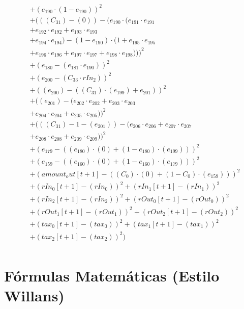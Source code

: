 \documentclass[10pt, a4paper]{article}
\begin{document}
\begin{small}
\begin{align*}
& + (e_{190} \cdot (1 - e_{190}))^{2} \\
& + (((C_{31}) - (0)) - (e_{190} \cdot (e_{191} \cdot e_{191} \\
& + e_{192} \cdot e_{192} + e_{193} \cdot e_{193} \\
& + e_{194} \cdot e_{194}) - (1 - e_{190}) \cdot (1 + e_{195} \cdot e_{195} \\
& + e_{196} \cdot e_{196} + e_{197} \cdot e_{197} + e_{198} \cdot e_{198})))^{2} \\
& + (e_{180} - (e_{181} \cdot e_{190}))^{2} \\
& + (e_{200} - (C_{33}  \cdot  rIn_2))^{2} \\
& + ((e_{200}) - ((C_{31})  \cdot  (e_{199}) + e_{201}))^{2} \\
& + ((e_{201}) - (e_{202} \cdot e_{202} + e_{203} \cdot e_{203} \\
& + e_{204} \cdot e_{204} + e_{205} \cdot e_{205}))^{2} \\
& + (((C_{31}) - 1 - (e_{201})) - (e_{206} \cdot e_{206} + e_{207} \cdot e_{207} \\
& + e_{208} \cdot e_{208} + e_{209} \cdot e_{209}))^{2} \\
& + (e_{179} - ((e_{180})  \cdot  (0) + (1 - e_{180})  \cdot  (e_{199})))^{2} \\
& + (e_{159} - ((e_{160})  \cdot  (0) + (1 - e_{160})  \cdot  (e_{179})))^{2} \\
& + (amount_out[t+1] - ((C_{0})  \cdot  (0) + (1 - C_{0})  \cdot  (e_{159})))^{2} \\
& + (rIn_0[t+1] - (rIn_0))^{2} + (rIn_1[t+1] - (rIn_1))^{2} \\
& + (rIn_2[t+1] - (rIn_2))^{2} + (rOut_0[t+1] - (rOut_0))^{2} \\
& + (rOut_1[t+1] - (rOut_1))^{2} + (rOut_2[t+1] - (rOut_2))^{2} \\
& + (tax_0[t+1] - (tax_0))^{2} + (tax_1[t+1] - (tax_1))^{2} \\
& + (tax_2[t+1] - (tax_2))^{2}) \\
\end{align*}
\end{small}\part{Fórmulas Matemáticas (Estilo Willans)}
\end{document}
